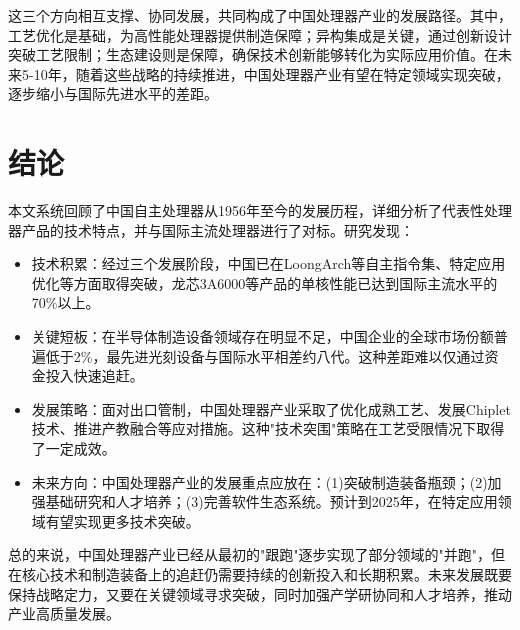 \documentclass[a4paper,colorlinks=true,linkcolor=blue,urlcolor=blue,citecolor=green,bookmarks=true]{article}
\begin{document}
这三个方向相互支撑、协同发展，共同构成了中国处理器产业的发展路径。其中，工艺优化是基础，为高性能处理器提供制造保障；异构集成是关键，通过创新设计突破工艺限制；生态建设则是保障，确保技术创新能够转化为实际应用价值。在未来5-10年，随着这些战略的持续推进，中国处理器产业有望在特定领域实现突破，逐步缩小与国际先进水平的差距。

\section{结论}

本文系统回顾了中国自主处理器从1956年至今的发展历程，详细分析了代表性处理器产品的技术特点，并与国际主流处理器进行了对标。研究发现：

\begin{itemize}
\item 技术积累：经过三个发展阶段，中国已在LoongArch等自主指令集、特定应用优化等方面取得突破，龙芯3A6000等产品的单核性能已达到国际主流水平的70\%以上。

\item 关键短板：在半导体制造设备领域存在明显不足，中国企业的全球市场份额普遍低于2\%，最先进光刻设备与国际水平相差约八代。这种差距难以仅通过资金投入快速追赶。

\item 发展策略：面对出口管制，中国处理器产业采取了优化成熟工艺、发展Chiplet技术、推进产教融合等应对措施。这种"技术突围"策略在工艺受限情况下取得了一定成效。

\item 未来方向：中国处理器产业的发展重点应放在：(1)突破制造装备瓶颈；(2)加强基础研究和人才培养；(3)完善软件生态系统。预计到2025年，在特定应用领域有望实现更多技术突破。
\end{itemize}

总的来说，中国处理器产业已经从最初的"跟跑"逐步实现了部分领域的"并跑"，但在核心技术和制造装备上的追赶仍需要持续的创新投入和长期积累。未来发展既要保持战略定力，又要在关键领域寻求突破，同时加强产学研协同和人才培养，推动产业高质量发展。

\clearpage
\def\bibsection{
  \section*{\refname\markboth{\refname}{\refname}}%
  \addcontentsline{toc}{section}{\refname}%
  \begingroup
    \fontsize{12}{14}\selectfont%
    \vspace{0.8em}
  \endgroup
}

\nocite{*}


\end{document}
